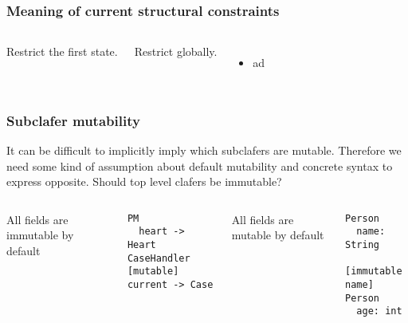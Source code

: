 \documentclass[xcolor=dvipsnames,12pt]{beamer}
\begin{document}
  \begin{frame}[fragile]
    \frametitle{Meaning of current structural constraints}
    \begin{columns}[c]
      \column{2in}
      Restrict the first state.

    \column{2in}
    Restrict globally.
    \begin{itemize}
      \item{ad}
      \end{itemize}
    \end{columns}    
\end{frame}

  \begin{frame}[fragile]
    \frametitle{Subclafer mutability}
    It can be difficult to implicitly imply which subclafers are mutable. Therefore we need some kind of assumption about default mutability and concrete syntax to express opposite. Should top level clafers be immutable?

    \mbox{}

    \begin{columns}[c]
      \column{1.8in}
      All fields are immutable by default
\begin{verbatim}
PM
  heart -> Heart
CaseHandler
[mutable] current -> Case
\end{verbatim}
\column{1.8in}
All fields are mutable by default
\begin{verbatim}
Person
  name: String
  [immutable name]
Person
  age: int
\end{verbatim}
\end{columns}    
\end{frame}
\end{document}

